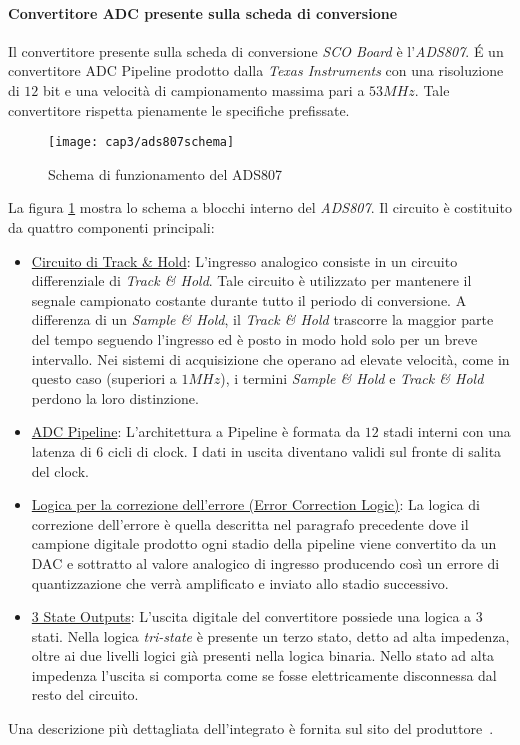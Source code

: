 \paragraph{Convertitore ADC presente sulla scheda di conversione}
Il convertitore presente sulla scheda di conversione \textit{SCO Board} è l'\textit{ADS807}. \'E un convertitore ADC Pipeline prodotto dalla \textit{Texas Instruments} con una risoluzione di $12$ bit e una velocità di campionamento massima pari a $53MHz$. Tale convertitore rispetta pienamente le specifiche prefissate.

\begin{figure}  
  \begin{center}
    \texttt{[image: cap3/ads807schema]}
    \caption{Schema di funzionamento del ADS807}
    \label{ads807schema}
  \end{center}
\end{figure}

La figura \ref{ads807schema} mostra lo schema a blocchi interno del \textit{ADS807}.
Il circuito è costituito da quattro componenti principali:
\begin{itemize}
	\item \underline{Circuito di Track \& Hold}: L'ingresso analogico consiste in un circuito differenziale di \textit{Track \& Hold}. Tale circuito è utilizzato per mantenere il segnale campionato costante durante tutto il periodo di conversione. A differenza di un \textit{Sample \& Hold}, il \textit{Track \& Hold} trascorre la maggior parte del tempo seguendo l'ingresso ed è posto in modo hold solo per un breve intervallo. Nei sistemi di acquisizione che operano ad elevate velocità, come in questo caso (superiori a $1MHz$), i termini \textit{Sample \& Hold} e \textit{Track \& Hold} perdono la loro distinzione.
	\item \underline{ADC Pipeline}: L'architettura a Pipeline è formata da $12$ stadi interni con una latenza di $6$ cicli di clock. I dati in uscita diventano validi sul fronte di salita del clock.
	\item \underline{Logica per la correzione dell'errore (Error Correction Logic)}: La logica di correzione dell'errore è quella descritta nel paragrafo precedente dove il campione digitale prodotto ogni stadio della pipeline viene convertito da un DAC e sottratto al valore analogico di ingresso producendo così un errore di quantizzazione che verrà amplificato e inviato allo stadio successivo.
	\item \underline{3 State Outputs}: L'uscita digitale del convertitore possiede una logica a $3$ stati. Nella logica \textit{tri-state} è presente un terzo stato, detto ad alta impedenza, oltre ai due livelli logici già presenti nella logica binaria. Nello stato ad alta impedenza l'uscita si comporta come se fosse elettricamente disconnessa dal resto del circuito.
\end{itemize}
Una descrizione più dettagliata dell'integrato è fornita sul sito del produttore~\cite{siteads807}.


